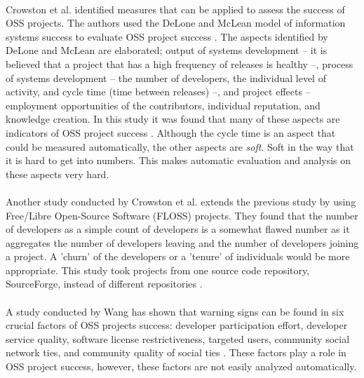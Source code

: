 \paragraph{}
Crowston et al. identified measures that can be applied to assess the success of
OSS projects. The authors used the DeLone and McLean model of information
systems success to evaluate OSS project success \cite{delone1992}. The aspects
identified by DeLone and McLean are elaborated; output of systems development -- it is
believed that a project that has a high frequency of releases is healthy --,
process of systems development -- the number of developers, the individual
level of activity, and cycle time (time between releases) --, and
project effects -- employment opportunities of the contributors, individual
reputation, and knowledge creation. In this study it was found that many of
these aspects are indicators of OSS project success \cite{crowston2003}.
Although the cycle time is an aspect that could be measured automatically, the
other aspects are \emph{soft}\rm. Soft in the way that it is hard to get into
numbers. This makes automatic evaluation and analysis on these aspects very
hard.

\paragraph{}
Another study conducted by Crowston et al. extends the previous study by using
Free/Libre Open-Source Software (FLOSS) projects. They found that the number of
developers as a simple count of developers is a somewhat flawed number as
it aggregates the number of developers leaving and the number of developers
joining a project. A 'churn' of the developers or a 'tenure' of individuals
would be more appropriate.
This study took projects from one source code repository,
SourceForge, instead of different repositories \cite{crowston2006}.

\paragraph{}
A study conducted by Wang has shown that warning signs can be found in
six crucial factors of OSS projects success: developer participation effort,
developer service quality, software license restrictiveness, targeted users,
community social network ties, and community quality of social ties
\cite{wang2012}.
These factors play a role in OSS project success, however, these factors are not
easily analyzed automatically.

